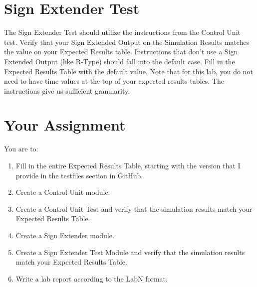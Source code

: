 \section{Sign Extender Test}
The Sign Extender Test should utilize the instructions from the Control Unit test.  Verify that your Sign Extended Output on the Simulation Results matches the value on your Expected Results table.  Instructions that don't use a Sign Extended Output (like R-Type) should fall into the default case.  Fill in the Expected Results Table with the default value.   Note that for this lab, you do not need to have time values at the top of your expected results tables.  The instructions give us sufficient granularity.

\clearpage
\section{Your Assignment}

You are to:
\begin{enumerate}
\item Fill in the entire Expected Results Table, starting with the version that I provide in the testfiles section in GitHub.
\item Create a Control Unit module.
\item Create a Control Unit Test and verify that the simulation results match your Expected Results Table.
\item Create a Sign Extender module.
\item Create a Sign Extender Test Module and verify that the simulation results match your Expected Results Table.
\item  Write a lab report according to the LabN format.
\end{enumerate} 